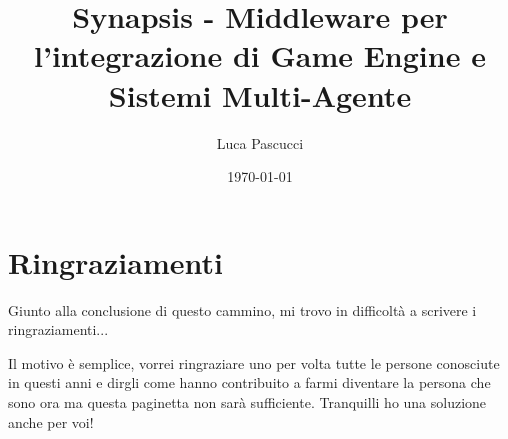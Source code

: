 \documentclass[12pt,a4paper,italian]{book}
\author{Luca Pascucci}
\title{Synapsis - Middleware per l'integrazione di Game Engine e Sistemi Multi-Agente}
\date{\today}
\begin{document}

\frontmatter \maketitle \pagestyle{plain} \tableofcontents





\mainmatter

\pagestyle{fancy} \fancyhead[LE,RO]{\bfseries\thepage}















\appendix %






\chapter*{Ringraziamenti}

\noindent Giunto alla conclusione di questo cammino, mi trovo in difficoltà a scrivere i ringraziamenti...

\medskip

\noindent Il motivo è semplice, vorrei ringraziare uno per volta tutte le persone conosciute in questi anni e dirgli come hanno contribuito a farmi diventare la persona che sono ora ma questa paginetta non sarà sufficiente. Tranquilli ho una soluzione anche per voi!
\end{document}
